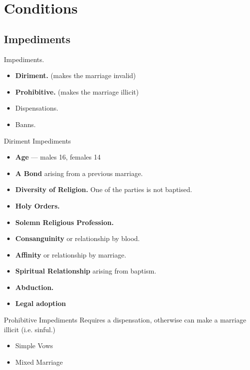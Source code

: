 \documentclass{beamer}
\begin{document}
\section{Conditions}

\subsection{Impediments}

\begin{frame}{Impediments.}
\begin{itemize}
 \item   \textbf{Diriment.} (makes the marriage invalid)
 \item   \textbf{Prohibitive.} (makes the marriage illicit)
 \item   Dispensations.
 \item   Banns.
\end{itemize}
\end{frame}

\begin{frame}{Diriment Impediments}
\begin{itemize}
\item  \textbf{Age} --- males 16, females 14
\item  \textbf{A  Bond}  arising  from  a  previous  marriage. 
\item  \textbf{Diversity of Religion.} One of the parties is not baptised.
\item   \textbf{Holy Orders.}
\item  \textbf{Solemn Religious Profession.}
\item  \textbf{Consanguinity} or relationship by blood.
\item   \textbf{Affinity} or relationship by marriage.
\item \textbf{Spiritual Relationship} arising  from  baptism. 
\item  \textbf{Abduction.}
\item   \textbf{Legal adoption}
\end{itemize}
\end{frame}

\begin{frame}{Prohibitive Impediments}
Requires a dispensation, otherwise can make a marriage illicit (i.e. sinful.)
\begin{itemize}
\item Simple Vows
\item Mixed Marriage
\end{itemize}
\end{frame}
\end{document}
